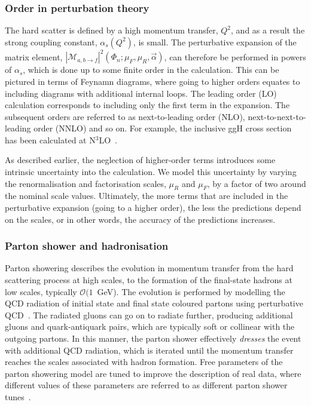 \subsubsection{Order in perturbation theory}
The hard scatter is defined by a high momentum transfer, $Q^2$, and as a result the strong coupling constant, $\alpha_s(Q^2)$, is small. The perturbative expansion of the matrix element, $|\mathcal{M}_{a,b\rightarrow f}|^2(\Phi_n;\mu_F,\mu_R,\vec{\alpha})$, can therefore be performed in powers of $\alpha_s$, which is done up to some finite order in the calculation. This can be pictured in terms of Feynamn diagrams,
where going to higher orders equates to including diagrams with additional internal loops. The leading order (LO) calculation corresponds to including only the first term in the expansion. The subsequent orders are referred to as next-to-leading order (NLO), next-to-next-to-leading order (NNLO) and so on. For example, the inclusive ggH cross section has been calculated at N$^{3}$LO~\cite{Anastasiou:2016cez}.

As described earlier, the neglection of higher-order terms introduces some intrinsic uncertainty into the calculation. We model this uncertainty by varying the renormalisation and factorisation scales, $\mu_R$ and $\mu_F$, by a factor of two around the nominal scale values.
Ultimately, the more terms that are included in the perturbative expansion (going to a higher order), the less the predictions depend on the scales, or in other words, the accuracy of the predictions increases.

\subsubsection{Parton shower and hadronisation}
Parton showering describes the evolution in momentum transfer from the hard scattering process at high scales, to the formation of the final-state hadrons at low scales, typically $\mathcal{O}(1$~GeV). The evolution is performed by modelling the QCD radiation of initial state and final state coloured partons using perturbative QCD~\cite{Buckley:2011ms}. The radiated gluons can go on to radiate further, producing additional gluons and quark-antiquark pairs, which are typically soft or collinear with the outgoing partons. In this manner, the parton shower effectively \textit{dresses} the event with additional QCD radiation, which is iterated until the momentum transfer reaches the scales associated with hadron formation. Free parameters of the parton showering model are tuned to improve the description of real data, where different values of these parameters are referred to as different parton shower tunes~\cite{Khachatryan:2015pea,Sirunyan:2019dfx}.

